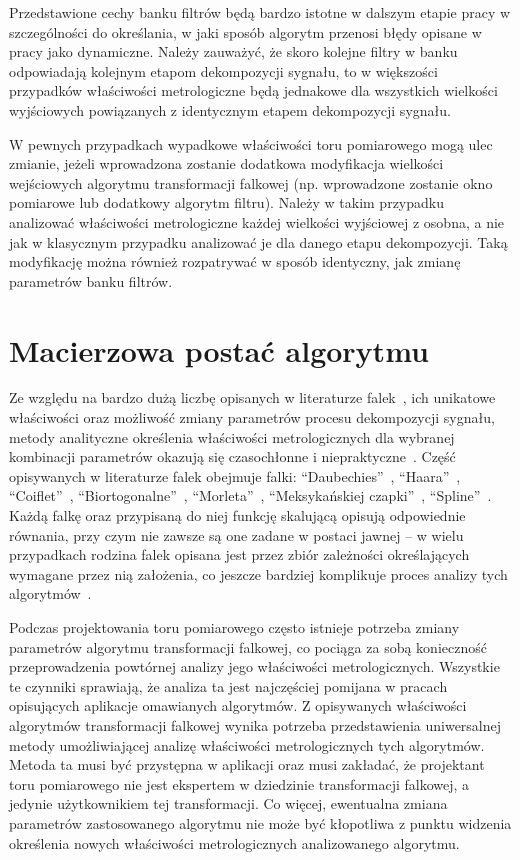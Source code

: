 Przedstawione cechy banku filtrów będą bardzo istotne w dalszym etapie pracy w szczególności do określania, w jaki sposób algorytm przenosi błędy opisane w pracy jako dynamiczne. Należy zauważyć, że skoro kolejne filtry w banku odpowiadają kolejnym etapom dekompozycji sygnału, to w większości przypadków właściwości metrologiczne będą jednakowe dla wszystkich wielkości wyjściowych powiązanych z identycznym etapem dekompozycji sygnału.

W pewnych przypadkach wypadkowe właściwości toru pomiarowego mogą ulec zmianie, jeżeli wprowadzona zostanie dodatkowa modyfikacja wielkości wejściowych algorytmu transformacji falkowej (np. wprowadzone zostanie okno pomiarowe lub dodatkowy algorytm filtru). Należy w takim przypadku analizować właściwości metrologiczne każdej wielkości wyjściowej z osobna, a nie jak w klasycznym przypadku analizować je dla danego etapu dekompozycji. Taką modyfikację można również rozpatrywać w sposób identyczny, jak zmianę parametrów banku filtrów.

\section{Macierzowa postać algorytmu}

Ze względu na bardzo dużą liczbę opisanych w literaturze falek~\cite{akujuobi_applications}, ich unikatowe właściwości oraz możliwość zmiany parametrów procesu dekompozycji sygnału, metody analityczne określenia właściwości metrologicznych dla wybranej kombinacji parametrów okazują się czasochłonne i niepraktyczne~\cite{yan_uncertainty, wilczok_uncertainty, peretto_uncertainty, sarrafi_uncertainty}. Część opisywanych w literaturze falek obejmuje falki: \enquote{Daubechies}~\cite{vonesch_dbbasics}, \enquote{Haara}~\cite{stankovic_haar}, \enquote{Coiflet}~\cite{wei_coiflet}, \enquote{Biortogonalne}~\cite{sweldens_bior}, \enquote{Morleta}~\cite{cohen_morlet}, \enquote{Meksykańskiej czapki}~\cite{singh_mexican}, \enquote{Spline}~\cite{averbuch_spline, wang_splinebasics}. Każdą falkę oraz przypisaną do niej funkcję skalującą opisują odpowiednie równania, przy czym nie zawsze są one zadane w postaci jawnej -- w wielu przypadkach rodzina falek opisana jest przez zbiór zależności określających wymagane przez nią założenia, co jeszcze bardziej komplikuje proces analizy tych algorytmów~\cite{rowe_dbmath}.

Podczas projektowania toru pomiarowego często istnieje potrzeba zmiany parametrów algorytmu transformacji falkowej, co pociąga za sobą konieczność przeprowadzenia powtórnej analizy jego właściwości metrologicznych. Wszystkie te czynniki sprawiają, że analiza ta jest najczęściej pomijana w pracach opisujących aplikacje omawianych algorytmów. Z opisywanych właściwości algorytmów transformacji falkowej wynika potrzeba przedstawienia uniwersalnej metody umożliwiającej analizę właściwości metrologicznych tych algorytmów. Metoda ta musi być przystępna w aplikacji oraz musi zakładać, że projektant toru pomiarowego nie jest ekspertem w dziedzinie transformacji falkowej, a jedynie użytkownikiem tej transformacji. Co więcej, ewentualna zmiana parametrów zastosowanego algorytmu nie może być kłopotliwa z punktu widzenia określenia nowych właściwości metrologicznych analizowanego algorytmu.

